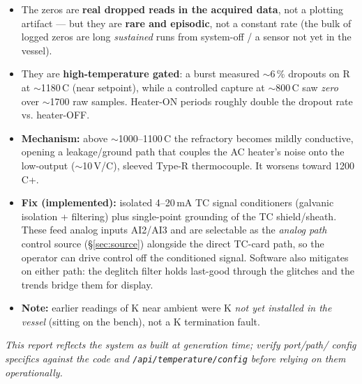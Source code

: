 \documentclass[11pt]{article}
\newcommand{\code}[1]{\texttt{#1}}
\begin{document}
\begin{itemize}[nosep]
  \item The zeros are \textbf{real dropped reads in the acquired data}, not a
  plotting artifact --- but they are \textbf{rare and episodic}, not a constant
  rate (the bulk of logged zeros are long \emph{sustained} runs from
  system-off / a sensor not yet in the vessel).
  \item They are \textbf{high-temperature gated}: a burst measured $\sim$6\,\%
  dropouts on R at $\sim$1180\,\textdegree C (near setpoint), while a controlled
  capture at $\sim$800\,\textdegree C saw \emph{zero} over $\sim$1700 raw samples.
  Heater-ON periods roughly double the dropout rate vs. heater-OFF.
  \item \textbf{Mechanism:} above $\sim$1000--1100\,\textdegree C the refractory
  becomes mildly conductive, opening a leakage/ground path that couples the AC
  heater's noise onto the low-output ($\sim$10\,\textmu V/\textdegree C), sleeved
  Type-R thermocouple. It worsens toward 1200\,\textdegree C+.
  \item \textbf{Fix (implemented):} isolated 4--20\,mA TC signal conditioners
  (galvanic isolation + filtering) plus single-point grounding of the TC
  shield/sheath. These feed analog inputs AI2/AI3 and are selectable as the
  \emph{analog path} control source (\S\ref{sec:source}) alongside the direct
  TC-card path, so the operator can drive control off the conditioned signal.
  Software also mitigates on either path: the deglitch filter holds last-good
  through the glitches and the trends bridge them for display.
  \item \textbf{Note:} earlier readings of K near ambient were K \emph{not yet
  installed in the vessel} (sitting on the bench), not a K termination fault.
\end{itemize}

\vfill
\begin{center}\small\itshape
This report reflects the system as built at generation time; verify port/path/
config specifics against the code and \code{/api/temperature/config} before
relying on them operationally.
\end{center}
\end{document}

